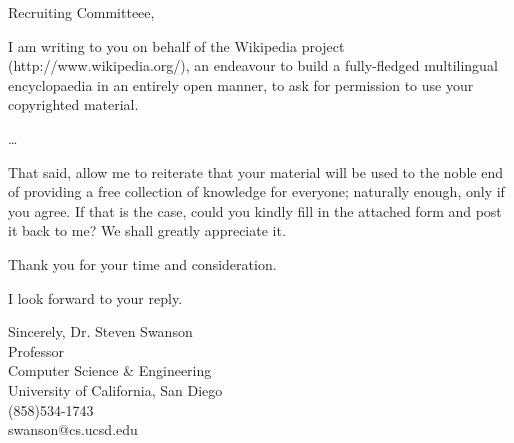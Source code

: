 \documentclass{letter}
\begin{document}
\begin{letter}{}
\opening{Recruiting Committeee,}

I am writing to you on behalf of the Wikipedia project (http://www.wikipedia.org/),
an endeavour to build a fully-fledged multilingual encyclopaedia in an entirely
open manner, to ask for permission to use your copyrighted material.

\ldots 

That said, allow me to reiterate that your material will be used to the noble end of
providing a free collection of knowledge for everyone; naturally enough, only if you
agree. If that is the case, could you kindly fill in the attached form and post it
back to me? We shall greatly appreciate it.

Thank you for your time and consideration.

I look forward to your reply.

\closing{Sincerely,
\vspace{1in}
Dr. Steven Swanson\\
Professor\\
Computer Science \& Engineering\\
University of California, San Diego\\
(858)534-1743\\
swanson@cs.ucsd.edu
}

\end{letter}
\end{document}
